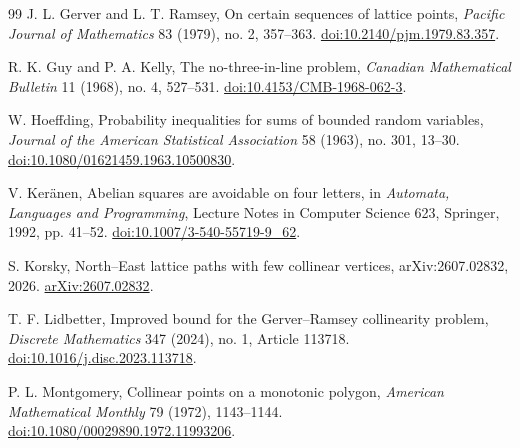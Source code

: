 \documentclass[11pt]{article}
\theoremstyle{plain}
\theoremstyle{definition}
\theoremstyle{remark}
\begin{document}
\begin{thebibliography}{99}
J. L. Gerver and L. T. Ramsey,
\newblock On certain sequences of lattice points,
\newblock \emph{Pacific Journal of Mathematics} 83 (1979), no. 2, 357--363.
\newblock \href{https://doi.org/10.2140/pjm.1979.83.357}{doi:10.2140/pjm.1979.83.357}.

R. K. Guy and P. A. Kelly,
\newblock The no-three-in-line problem,
\newblock \emph{Canadian Mathematical Bulletin} 11 (1968), no. 4, 527--531.
\newblock \href{https://doi.org/10.4153/CMB-1968-062-3}{doi:10.4153/CMB-1968-062-3}.

W. Hoeffding,
\newblock Probability inequalities for sums of bounded random variables,
\newblock \emph{Journal of the American Statistical Association} 58 (1963), no. 301, 13--30.
\newblock \href{https://doi.org/10.1080/01621459.1963.10500830}{doi:10.1080/01621459.1963.10500830}.

V. Ker\"anen,
\newblock Abelian squares are avoidable on four letters,
\newblock in \emph{Automata, Languages and Programming}, Lecture Notes in Computer Science 623, Springer, 1992, pp. 41--52.
\newblock \href{https://doi.org/10.1007/3-540-55719-9_62}{doi:10.1007/3-540-55719-9\_62}.

S. Korsky,
\newblock North--East lattice paths with few collinear vertices,
\newblock arXiv:2607.02832, 2026.
\newblock \href{https://arxiv.org/abs/2607.02832}{arXiv:2607.02832}.

T. F. Lidbetter,
\newblock Improved bound for the Gerver--Ramsey collinearity problem,
\newblock \emph{Discrete Mathematics} 347 (2024), no. 1, Article 113718.
\newblock \href{https://doi.org/10.1016/j.disc.2023.113718}{doi:10.1016/j.disc.2023.113718}.

P. L. Montgomery,
\newblock Collinear points on a monotonic polygon,
\newblock \emph{American Mathematical Monthly} 79 (1972), 1143--1144.
\newblock \href{https://doi.org/10.1080/00029890.1972.11993206}{doi:10.1080/00029890.1972.11993206}.

\end{thebibliography}
\end{document}
